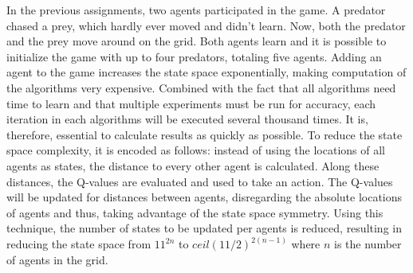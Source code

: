 In the previous assignments, two agents participated in the game. A predator chased a prey, which hardly ever moved and didn't learn. Now, both the predator and the prey move around on the grid. Both agents learn and it is possible to initialize the game with up to four predators, totaling five agents. Adding an agent to the game increases the state space exponentially, making computation of the algorithms very expensive. Combined with the fact that all algorithms need time to learn and that multiple experiments must be run for accuracy, each iteration in each algorithms will be executed several thousand times. It is, therefore, essential to calculate results as quickly as possible. To reduce the state space complexity, it is encoded as follows:  instead of using the locations of all agents as states, the distance to every other agent is calculated. Along these distances, the Q-values are evaluated and used to take an action. The Q-values will be updated for distances between agents, disregarding the absolute locations of agents and thus, taking advantage of the state space symmetry. Using this technique, the number of states to be updated per agents is reduced, resulting in reducing the state space from $11^{2n}$ to $ceil(11/2)^{2(n-1)}$ where $n$ is the number of agents in the grid.